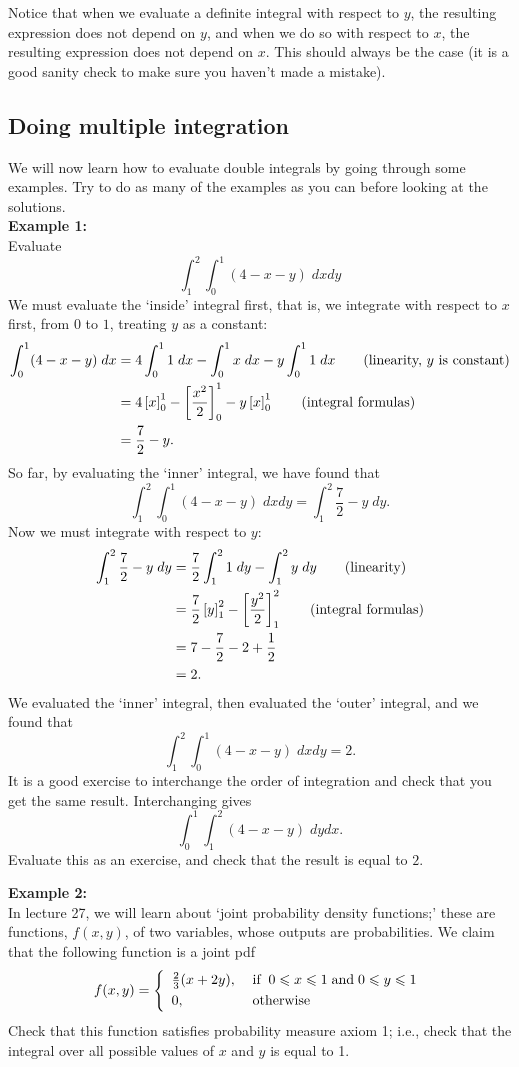 \noindent Notice that when we evaluate a definite integral with respect to $y$, the resulting expression does not depend on $y$, and when we do so with respect to $x$, the resulting expression does not depend on $x$. This should always be the case (it is a good sanity check to make sure you haven't made a mistake).

\subsection{Doing multiple integration}
We will now learn how to evaluate double integrals by going through some examples. Try to do as many of the examples as you can before looking at the solutions. \\

\noindent \textbf{Example 1:} \\
Evaluate
\[
\int_1^2 \int_0^1 (4-x-y) \; dx dy
\]
\solution
We must evaluate the `inside' integral first, that is, we integrate with respect to $x$ first, from $0$ to $1$, treating $y$ as a constant:
\begin{align*}
\int_0^1 (4-x-y) \; dx & = 4\int_0^1 1 \;dx - \int_0^1 x \; dx - y\int_0^1 1 \; dx \tag{linearity, $y$ is constant} \\
	& =  4\left[x\right]^1_0 - \left[\frac{x^2}{2}\right]^1_0 - y\left[x\right]^1_0 \tag{integral formulas} \\
	& = \frac{7}{2} - y.
\end{align*}
So far, by evaluating the `inner' integral, we have found that
\[
\int_1^2 \int_0^1 (4-x-y) \; dx dy = \int_1^2 \frac{7}{2} - y \; dy.
\]
Now we must integrate with respect to $y$:
\begin{align*}
 \int_1^2 \frac{7}{2} - y \; dy & = \frac{7}{2}\int_1^2 1 \; dy - \int_1^2 y \; dy \tag{linearity} \\
 	& = \frac{7}{2}\left[y\right]_1^2 - \left[\frac{y^2}{2}\right]_1^2 \tag{integral formulas} \\
 	& = 7 - \frac{7}{2} - 2 + \frac{1}{2} \\
 	& = 2.
\end{align*}
We evaluated the `inner' integral, then evaluated the `outer' integral, and we found that
\[
\int_1^2 \int_0^1 (4-x-y) \; dx dy = 2.
\]
It is a good exercise to interchange the order of integration and check that you get the same result. Interchanging gives
\[
\int_0^1 \int_1^2 (4-x-y) \; dy dx.
\]
Evaluate this as an exercise, and check that the result is equal to $2$.
\bigskip

\noindent \textbf{Example 2:} \\
In lecture 27, we will learn about `joint probability density functions;' these are functions, $f(x,y)$, of two variables, whose outputs are probabilities. We claim that the following function is a joint pdf 
\[
f(x,y) = \left\{ \begin{array}{ll}
\frac{2}{3}(x + 2y), & \; \text{if} \;\; 0 \leq x \leq 1 \; \text{and} \; 0 \leq y \leq 1 \smallskip \\
0, & \; \text{otherwise}
\end{array} \right.
\]
Check that this function satisfies probability measure axiom 1; i.e., check that the integral over all possible values of $x$ and $y$ is equal to 1. \\

